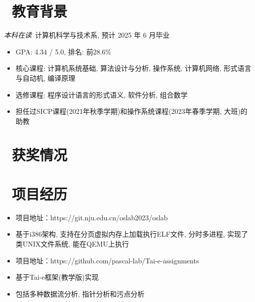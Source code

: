 \documentclass{resume}
\begin{document}


 
\section{\faGraduationCap\  教育背景}
\textit{本科在读}\ 计算机科学与技术系, 预计 2025 年 6 月毕业
\begin{itemize}[parsep=0.5ex]
  \item GPA: 4.34 / 5.0, 排名: 前28.6\%
  \item 核心课程: 计算机系统基础, 算法设计与分析, 操作系统, 计算机网络, 形式语言与自动机, 编译原理
  \item 选修课程: 程序设计语言的形式语义, 软件分析, 组合数学
  \item 担任过SICP课程(2021年秋季学期)和操作系统课程(2023年春季学期, 大班)的助教
\end{itemize}

\section{\faHeartO\ 获奖情况}

\section{\faUsers\ 项目经历}
\begin{itemize}[parsep=0.5ex,topsep=0pt]
  \item 项目地址：https://git.nju.edu.cn/oslab2023/oslab
  \item 基于i386架构, 支持在分页虚拟内存上加载执行ELF文件, 分时多进程, 实现了类UNIX文件系统, 能在QEMU上执行
\end{itemize}

\vspace{0.5ex}

\begin{itemize}[parsep=0.5ex,topsep=0pt]
  \item 项目地址：https://github.com/pascal-lab/Tai-e-assignments
  \item 基于Tai-e框架(教学版)实现
  \item 包括多种数据流分析, 指针分析和污点分析
\end{itemize}
\end{document}
